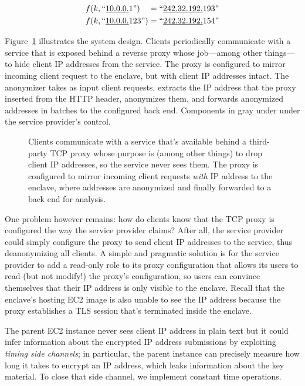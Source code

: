\begin{align}
f(k, \textrm{``\underline{10.0.0.}1''})\phantom{23} = \textrm{``\underline{242.32.192.}193''} \\
f(k, \textrm{``\underline{10.0.0.}123''}) = \textrm{``\underline{242.32.192.}154''}
\end{align}

Figure~\ref{fig:address-anonymizer} illustrates the system design.  Clients periodically communicate with a service that is exposed behind a reverse proxy whose job---among other things---to hide client IP addresses from the service.  The proxy is configured to mirror incoming client request to the enclave, but with client IP addresses intact.  The anonymizer takes as input client requests, extracts the IP address that the proxy inserted from the HTTP header, anonymizes them, and forwards anonymized addresses in batches to the configured back end.  Components in gray under under the service provider's control.

\begin{figure}[t]
\centering

\caption{Clients communicate with a service that's available behind a third-party TCP proxy whose purpose is (among other things) to drop client IP addresses, so the service never sees them.  The proxy is configured to mirror incoming client requests \emph{with} IP address to the enclave, where addresses are anonymized and finally forwarded to a back end for analysis.}
\label{fig:address-anonymizer}
\end{figure}

One problem however remains: how do clients know that the TCP proxy is configured the way the service provider claims?  After all, the service provider could simply configure the proxy to send client IP addresses to the service, thus deanonymizing all clients.  A simple and pragmatic solution is for the service provider to add a read-only role to its proxy configuration that allows its users to read (but not modify!) the proxy's configuration, so users can convince themselves that their IP address is only visible to the enclave.  Recall that the enclave's hosting EC2 image is also unable to see the IP address because the proxy establishes a TLS session that's terminated inside the enclave.


The parent EC2 instance never sees client IP address in plain text but it could infer information about the encrypted IP address submissions by exploiting \emph{timing side channels}; in particular, the parent instance can precisely measure how long it takes to encrypt an IP address, which leaks information about the key material.  To close that side channel, we implement constant time operations.

